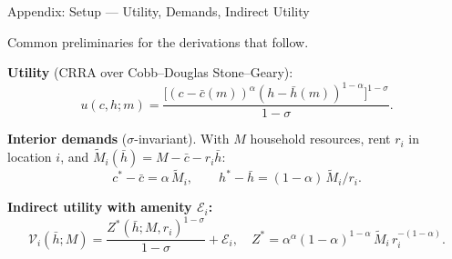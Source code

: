 \documentclass[11pt,aspectratio=169]{beamer}
\begin{document}

\begin{frame}{Appendix: Setup --- Utility, Demands, Indirect Utility \; \hyperlink{slide1-main}{}}
\label{app:setup}
\small

Common preliminaries for the derivations that follow.

\vspace{0.4em}
\textbf{Utility} (CRRA over Cobb--Douglas Stone--Geary):
\vspace{-0.4em}
\[
u(c,h;m) = \frac{\bigl[(c-\bar c(m))^\alpha(h-\bar h(m))^{1-\alpha}\bigr]^{1-\sigma}}{1-\sigma}.
\]

\vspace{0.2em}
\textbf{Interior demands} ($\sigma$-invariant). With $M$ household resources, rent $r_i$ in location $i$, and $\tilde M_i(\bar h) = M - \bar c - r_i\bar h$:
\vspace{-0.4em}
\[
c^\ast - \bar c = \alpha\,\tilde M_i,
\qquad
h^\ast - \bar h = (1-\alpha)\,\tilde M_i / r_i.
\]

\vspace{0.2em}
\textbf{Indirect utility with amenity $\mathcal E_i$:}
\vspace{-0.4em}
\[
\mathcal V_i(\bar h; M) = \frac{Z^\ast(\bar h; M, r_i)^{1-\sigma}}{1-\sigma} + \mathcal E_i,
\quad
Z^\ast = \alpha^\alpha(1-\alpha)^{1-\alpha}\,\tilde M_i\,r_i^{-(1-\alpha)}.
\]
\end{frame}
\end{document}
